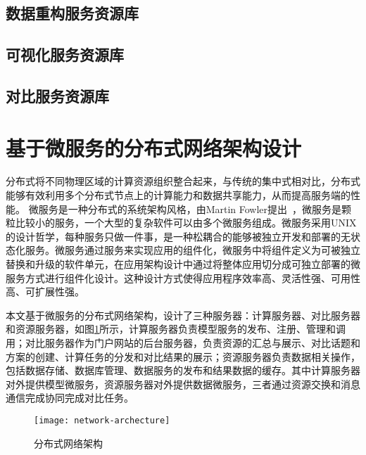 \subsection{数据重构服务资源库}



\subsection{可视化服务资源库}



\subsection{对比服务资源库}


\section{基于微服务的分布式网络架构设计}
分布式将不同物理区域的计算资源组织整合起来，与传统的集中式相对比，分布式能够有效利用多个分布式节点上的计算能力和数据共享能力，从而提高服务端的性能。
微服务是一种分布式的系统架构风格，由Martin Fowler提出~\cite{fowler2014microservices}，微服务是颗粒比较小的服务，一个大型的复杂软件可以由多个微服务组成。微服务采用UNIX的设计哲学，每种服务只做一件事，是一种松耦合的能够被独立开发和部署的无状态化服务。微服务通过服务来实现应用的组件化，微服务中将组件定义为可被独立替换和升级的软件单元，在应用架构设计中通过将整体应用切分成可独立部署的微服务方式进行组件化设计。这种设计方式使得应用程序效率高、灵活性强、可用性高、可扩展性强。

本文基于微服务的分布式网络架构，设计了三种服务器：计算服务器、对比服务器和资源服务器，如图\ref{fig:network-archecture}所示，计算服务器负责模型服务的发布、注册、管理和调用；对比服务器作为门户网站的后台服务器，负责资源的汇总与展示、对比话题和方案的创建、计算任务的分发和对比结果的展示；资源服务器负责数据相关操作，包括数据存储、数据库管理、数据服务的发布和结果数据的缓存。其中计算服务器对外提供模型微服务，资源服务器对外提供数据微服务，三者通过资源交换和消息通信完成协同完成对比任务。

\begin{figure}[!htbp]
    \centering
    \texttt{[image: network-archecture]}
    \caption{分布式网络架构}
    \label{fig:network-archecture}
\end{figure}

